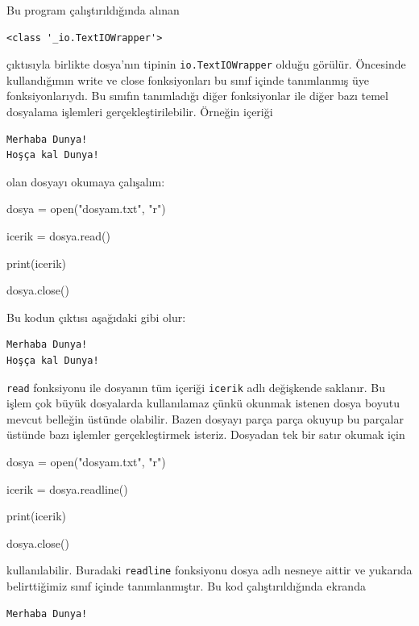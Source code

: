 \documentclass[12pt]{report}
\begin{document}
Bu program çalıştırıldığında alınan 

\begin{verbatim}
<class '_io.TextIOWrapper'>
\end{verbatim}

çıktısıyla birlikte dosya'nın tipinin \texttt{io.TextIOWrapper} olduğu görülür. Öncesinde kullandığımın write ve close fonksiyonları bu sınıf içinde tanımlanmış üye fonksiyonlarıydı. Bu sınıfın tanımladığı diğer fonksiyonlar ile diğer bazı temel dosyalama işlemleri gerçekleştirilebilir. Örneğin içeriği 

\begin{verbatim}
Merhaba Dunya!
Hoşça kal Dunya!
\end{verbatim}

olan dosyayı okumaya çalışalım:


\begin{python}
dosya = open("dosyam.txt", "r")

icerik = dosya.read()

print(icerik)

dosya.close()
\end{python}

Bu kodun çıktısı aşağıdaki gibi olur:

\begin{verbatim}
Merhaba Dunya!
Hoşça kal Dunya!
\end{verbatim}

\texttt{read} fonksiyonu ile dosyanın tüm içeriği \texttt{icerik} adlı değişkende saklanır. Bu işlem çok büyük dosyalarda kullanılamaz çünkü okunmak istenen dosya boyutu mevcut belleğin üstünde olabilir. Bazen dosyayı parça parça okuyup bu parçalar üstünde bazı işlemler gerçekleştirmek isteriz. Dosyadan tek bir satır okumak için 



\begin{python}
dosya = open("dosyam.txt", "r")

icerik = dosya.readline()

print(icerik)

dosya.close()
\end{python}

kullanılabilir. Buradaki \texttt{readline} fonksiyonu dosya adlı nesneye aittir ve yukarıda belirttiğimiz sınıf içinde tanımlanmıştır. Bu kod çalıştırıldığında ekranda

\begin{verbatim}
Merhaba Dunya!
\end{verbatim}
\end{document}
